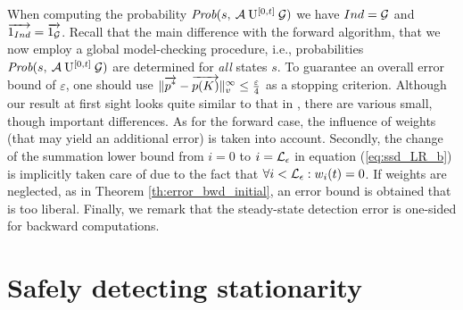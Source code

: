 \documentclass[a4paper,11pt]{article}
\newcommand{\Section}[1]{\section{#1}}
\begin{document}
		When computing the probability $\mbox{\it Prob}(s, \: \mathcal{A} \: \mathrm{U}^{[0,t]} \: \mathcal{G} )$ we have $Ind = \mathcal{G}$ and $\overrightarrow{1_{Ind}} = \overrightarrow{1_{\mathcal{G}}}$. Recall that the main difference with the forward algorithm, that we now employ a global model-checking procedure, i.e., probabilities $\mbox{\it Prob}(s, \: \mathcal{A} \: \mathrm{U}^{[0,t]} \: \mathcal{G} )$ are determined for \emph{all} states $s$. To guarantee an overall error bound of $\varepsilon$, one should use $\lVert  \overrightarrow{p^{*}} - \overrightarrow{p(K)}  \rVert_{v}^{\infty} \leq \frac{\varepsilon}{4}$ as a stopping criterion.  Although our result at first sight looks quite similar to that in \cite{YounesKNP_STTT05}, there are various small, though important differences.  As for the forward case, the influence of weights (that may yield an additional error) is taken into account.  Secondly, the change of the summation lower bound from $i=0$ to $i=\mathcal{L}_{\epsilon}$ in equation (\ref{eq:ssd_LR_b}) is implicitly taken care of due to the fact that $\forall i < \mathcal{L}_{\epsilon} : w_{i}(t) = 0$. If weights are neglected, as in Theorem \ref{th:error_bwd_initial}, an error bound is obtained that is too liberal. Finally, we remark that the steady-state detection error is one-sided for backward computations.

\Section{Safely detecting stationarity \label{s:osf}}
	
\end{document}
